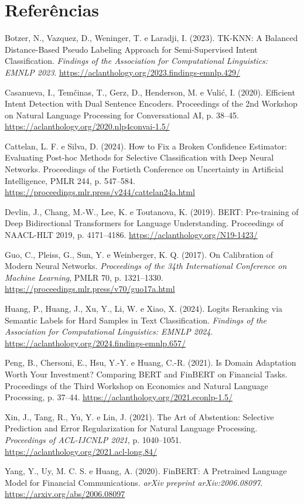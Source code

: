 \documentclass[12pt,a4paper]{article}
\begin{document}
\section*{\textbf{Referências}}

Botzer, N., Vazquez, D., Weninger, T. e Laradji, I. (2023). TK-KNN: A Balanced Distance-Based Pseudo Labeling Approach for Semi-Supervised Intent Classification. \emph{Findings of the Association for Computational Linguistics: EMNLP 2023}. \url{https://aclanthology.org/2023.findings-emnlp.429/}

Casanueva, I., Temčinas, T., Gerz, D., Henderson, M. e Vulić, I. (2020). Efficient Intent Detection with Dual Sentence Encoders. Proceedings of the 2nd Workshop on Natural Language Processing for Conversational AI, p. 38–45. \url{https://aclanthology.org/2020.nlp4convai-1.5/}

Cattelan, L. F. e Silva, D. (2024). How to Fix a Broken Confidence Estimator: Evaluating Post-hoc Methods for Selective Classification with Deep Neural Networks. Proceedings of the Fortieth Conference on Uncertainty in Artificial Intelligence, PMLR 244, p. 547–584. \url{https://proceedings.mlr.press/v244/cattelan24a.html}

Devlin, J., Chang, M.-W., Lee, K. e Toutanova, K. (2019). BERT: Pre-training of Deep Bidirectional Transformers for Language Understanding. Proceedings of NAACL-HLT 2019, p. 4171–4186. \url{https://aclanthology.org/N19-1423/}

Guo, C., Pleiss, G., Sun, Y. e Weinberger, K. Q. (2017). On Calibration of Modern Neural Networks. \emph{Proceedings of the 34th International Conference on Machine Learning}, PMLR 70, p. 1321–1330. \url{https://proceedings.mlr.press/v70/guo17a.html}

Huang, P., Huang, J., Xu, Y., Li, W. e Xiao, X. (2024). Logits Reranking via Semantic Labels for Hard Samples in Text Classification. \emph{Findings of the Association for Computational Linguistics: EMNLP 2024}. \url{https://aclanthology.org/2024.findings-emnlp.657/}

Peng, B., Chersoni, E., Hsu, Y.-Y. e Huang, C.-R. (2021). Is Domain Adaptation Worth Your Investment? Comparing BERT and FinBERT on Financial Tasks. Proceedings of the Third Workshop on Economics and Natural Language Processing, p. 37–44. \url{https://aclanthology.org/2021.econlp-1.5/}

Xin, J., Tang, R., Yu, Y. e Lin, J. (2021). The Art of Abstention: Selective Prediction and Error Regularization for Natural Language Processing. \emph{Proceedings of ACL-IJCNLP 2021}, p. 1040–1051. \url{https://aclanthology.org/2021.acl-long.84/}

Yang, Y., Uy, M. C. S. e Huang, A. (2020). FinBERT: A Pretrained Language Model for Financial Communications. \emph{arXiv preprint arXiv:2006.08097}. \url{https://arxiv.org/abs/2006.08097}
\end{document}
